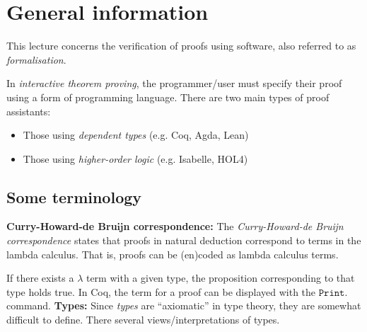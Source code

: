 \section{General information}

This lecture concerns the verification of proofs using software,
also referred to as \emph{formalisation}.

In \emph{interactive theorem proving}, the programmer/user must
specify their proof using a form of programming language.
There are two main types of proof assistants:
\begin{itemize}
  \item Those using \emph{dependent types} (e.g. Coq, Agda, Lean)
  \item Those using \emph{higher-order logic} (e.g. Isabelle, HOL4)
\end{itemize}

\subsection{Some terminology}
\begin{infobox}
  \textbf{Curry-Howard-de Bruĳn correspondence:}
  The \emph{Curry-Howard-de Bruĳn correspondence} states that proofs in natural
  deduction correspond to terms in the lambda calculus.
  That is, proofs can be (en)coded as lambda calculus terms.

  If there exists a $\lambda$ term with a given type, the proposition corresponding to
  that type holds true.
  In Coq, the term for a proof can be displayed with the $\texttt{Print.}$ command. \br
  \textbf{Types:}
  Since \emph{types} are ``axiomatic'' in type theory, they are somewhat difficult
  to define. There several views/interpretations of types.
\end{infobox}
